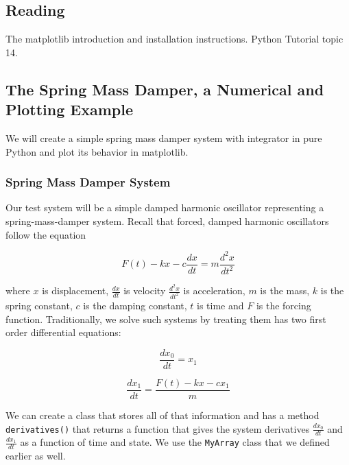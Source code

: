 \subsection{Reading}
The matplotlib introduction and installation instructions. Python Tutorial topic 14.

\subsection{The Spring Mass Damper, a Numerical and Plotting Example}

We will create a simple spring mass damper system with integrator in pure Python and plot its behavior in matplotlib.

\subsubsection{Spring Mass Damper System}

Our test system will be a simple damped harmonic oscillator representing a spring-mass-damper system. Recall that forced, damped harmonic oscillators follow the equation\cite{website:wikipedia}

\begin{displaymath}
F(t)-kx-c\frac{dx}{dt}=m\frac{d^2x}{dt^2}
\end{displaymath}

where \(x\) is displacement, \(\frac{dx}{dt}\) is velocity \(\frac{d^2x}{dt^2}\) is acceleration, \(m\) is the mass, \(k\) is the spring constant, \(c\) is the damping constant, \(t\) is time and \(F\) is the forcing function. Traditionally, we solve such systems by treating them has two first order differential equations:

\begin{displaymath}
\frac{dx_0}{dt} = x_1
\end{displaymath}

\begin{displaymath}
\frac{dx_1}{dt} =  \frac{F(t)-kx-c x_1}{m}
\end{displaymath}


We can create a class that stores all of that information and has a method \verb|derivatives()| that returns a function that gives the system derivatives \(\frac{dx_0}{dt}\) and \(\frac{dx_1}{dt}\) as a function of time and state. We use the \verb|MyArray| class that we defined earlier as well. 

